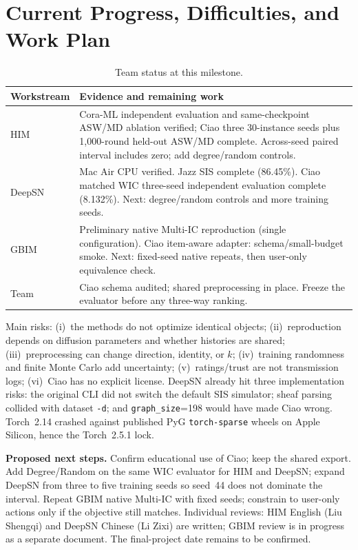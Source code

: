 \documentclass[10pt,twocolumn]{article}
\begin{document}
\section{Current Progress, Difficulties, and Work Plan}
\begin{table}[ht]
\centering\footnotesize
\caption{Team status at this milestone.}
\label{tab:status}
\begin{tabularx}{\columnwidth}{@{}lX@{}}
\toprule
Workstream & Evidence and remaining work \\
\midrule
HIM & Cora-ML independent evaluation and same-checkpoint ASW/MD ablation verified; Ciao three 30-instance seeds plus 1,000-round held-out ASW/MD complete. Across-seed paired interval includes zero; add degree/random controls. \\
DeepSN & Mac Air CPU verified. Jazz SIS complete (86.45\%). Ciao matched WIC three-seed independent evaluation complete (8.132\%). Next: degree/random controls and more training seeds. \\
GBIM & Preliminary native Multi-IC reproduction (single configuration). Ciao item-aware adapter: schema/small-budget smoke. Next: fixed-seed native repeats, then user-only equivalence check. \\
Team & Ciao schema audited; shared preprocessing in place. Freeze the evaluator before any three-way ranking. \\
\bottomrule
\end{tabularx}
\end{table}

Main risks: (i)~the methods do not optimize identical objects; (ii)~reproduction depends on diffusion parameters and whether histories are shared; (iii)~preprocessing can change direction, identity, or $k$; (iv)~training randomness and finite Monte Carlo add uncertainty; (v)~ratings/trust are not transmission logs; (vi)~Ciao has no explicit license. DeepSN already hit three implementation risks: the original CLI did not switch the default SIS simulator; sheaf parsing collided with dataset \texttt{-d}; and \texttt{graph\_size}=198 would have made Ciao wrong. Torch~2.14 crashed against published PyG \texttt{torch-sparse} wheels on Apple Silicon, hence the Torch~2.5.1 lock.

\textbf{Proposed next steps.} Confirm educational use of Ciao; keep the shared export. Add Degree/Random on the same WIC evaluator for HIM and DeepSN; expand DeepSN from three to five training seeds so seed~44 does not dominate the interval. Repeat GBIM native Multi-IC with fixed seeds; constrain to user-only actions only if the objective still matches. Individual reviews: HIM English (Liu Shengqi) and DeepSN Chinese (Li Zixi) are written; GBIM review is in progress as a separate document. The final-project date remains to be confirmed.
\end{document}

